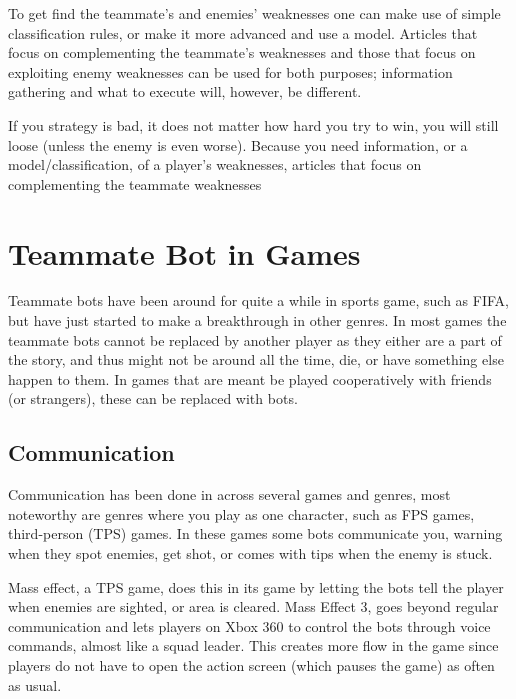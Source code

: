 To get find the teammate’s and enemies’ weaknesses one can make use of simple classification rules, or make it more advanced and use a model. Articles that focus on complementing the teammate’s weaknesses\cite{jansen07, pucheng11,houlette03} and those that focus on exploiting enemy weaknesses\cite{kabanza10, schadd07, synnaeve11} can be used for both purposes; information gathering and what to execute will, however, be different.

If you strategy is bad, it does not matter how hard you try to win, you will still loose (unless the enemy is even worse). Because you need information, or a model/classification, of a player’s weaknesses, articles that focus on complementing the teammate weaknesses

\section{Teammate Bot in Games}
Teammate bots have been around for quite a while in sports game, such as FIFA\cite{fifa}, but have just started to make a breakthrough in other genres. In most games\cite{callofduty, brotherinarms, rainbow6} the teammate bots cannot be replaced by another player as they either are a part of the story, and thus might not be around all the time, die, or have something else happen to them. In games that are meant be played cooperatively with friends (or strangers), these can be replaced with bots\cite{residentevil5, lostplanet2}.


\subsection{Communication}
\label{sec:games_communication}
Communication has been done in across several games and genres, most noteworthy are genres where you play as one character, such as FPS games, third-person (TPS) games. In these games some bots communicate you, warning when they spot enemies, get shot, or comes with tips when the enemy is stuck.

Mass effect, a TPS game, does this in its game by letting the bots tell the player when enemies are sighted, or area is cleared. Mass Effect 3, goes beyond regular communication and lets players on Xbox 360 to control the bots through voice commands, almost like a squad leader. This creates more flow in the game since players do not have to open the action screen (which pauses the game) as often as usual.



